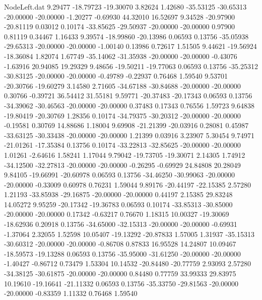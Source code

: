 \begin{filecontents}{NodeLeft.dat}
   9.29477  -18.79723  -19.30070     3.82624    1.42680  -35.53125  -30.65313  -20.00000  -20.00000   -1.20277   -0.69930   44.32010   16.52697
   9.34528  -20.97900  -20.81119     0.03012    0.10174  -33.85625  -29.50937  -20.00000  -20.00000    0.97900    0.81119    0.34467    1.16433
   9.39574  -18.99860  -20.13986     0.06593    0.13756  -35.05938  -29.65313  -20.00000  -20.00000   -1.00140    0.13986    0.72617    1.51505
   9.44621  -19.56924  -18.36084     1.82074    1.67749  -35.14062  -31.35938  -20.00000  -20.00000   -0.43076   -1.63916   20.94085   19.29329
   9.48656  -19.50211  -19.77063     0.06593    0.13756  -35.25312  -30.83125  -20.00000  -20.00000   -0.49789   -0.22937    0.76468    1.59540
   9.53701  -20.30766  -19.60279     3.14580    2.71605  -34.67188  -30.84688  -20.00000  -20.00000    0.30766   -0.39721   36.54412   31.55181
   9.59771  -20.37483  -20.17343     0.06593    0.13756  -34.39062  -30.46563  -20.00000  -20.00000    0.37483    0.17343    0.76556    1.59723
   9.64838  -19.80419  -20.30769     1.28356    0.10174  -34.79375  -30.20312  -20.00000  -20.00000   -0.19581    0.30769   14.88686    1.18004
   9.69908  -21.21399  -20.03916     0.28081    0.45987  -33.63125  -30.33438  -20.00000  -20.00000    1.21399    0.03916    3.23907    5.30454
   9.74971  -21.01261  -17.35384     0.13756    0.10174  -33.22813  -32.85625  -20.00000  -20.00000    1.01261   -2.64616    1.58241    1.17044
   9.79042  -19.73705  -19.30071     2.14305    1.74912  -34.12500  -32.27813  -20.00000  -20.00000   -0.26295   -0.69929   24.84808   20.28049
   9.84105  -19.66991  -20.60978     0.06593    0.13756  -34.46250  -30.99063  -20.00000  -20.00000   -0.33009    0.60978    0.76231    1.59044
   9.89176  -20.44197  -22.15385     2.57280    1.21193  -33.85938  -29.16875  -20.00000  -20.00000    0.44197    2.15385   29.83248   14.05272
   9.95259  -20.17342  -19.36783     0.06593    0.10174  -33.85313  -30.85000  -20.00000  -20.00000    0.17342   -0.63217    0.76670    1.18315
  10.00327  -19.30069  -18.62936     0.20918    0.13756  -34.65000  -32.15313  -20.00000  -20.00000   -0.69931   -1.37064    2.32055    1.52598
  10.05407  -19.13292  -20.87833     1.57005    1.31937  -35.15313  -30.60312  -20.00000  -20.00000   -0.86708    0.87833   16.95528   14.24807
  10.09467  -18.59573  -19.13288     0.06593    0.13756  -35.95000  -31.61250  -20.00000  -20.00000   -1.40427   -0.86712    0.73479    1.53304
  10.14532  -20.84480  -20.77759     2.93093    2.57280  -34.38125  -30.61875  -20.00000  -20.00000    0.84480    0.77759   33.99333   29.83975
  10.19610  -19.16641  -21.11332     0.06593    0.13756  -35.33750  -29.81563  -20.00000  -20.00000   -0.83359    1.11332    0.76468    1.59540

\end{filecontents}
